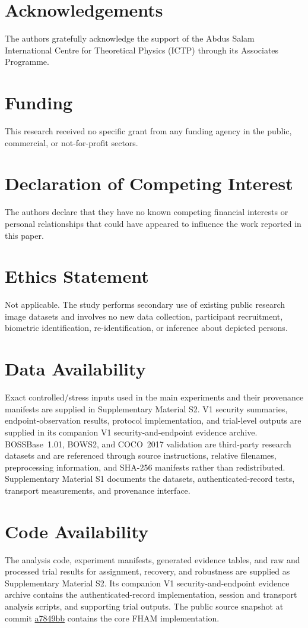 \documentclass[preprint,12pt]{elsarticle}
\theoremstyle{plain}
\providecommand{\DIFaddtex}[1]{{\protect\color{blue} \sf #1}} %
\providecommand{\DIFadd}[1]{\texorpdfstring{\DIFaddtex{#1}}{#1}} %
\begin{document}
\section*{Acknowledgements}
The authors gratefully acknowledge the support of the Abdus Salam International Centre for Theoretical Physics (ICTP) through its Associates Programme.

\section*{Funding}
This research received no specific grant from any funding agency in the public, commercial, or not-for-profit sectors.
\section*{Declaration of Competing Interest}
The authors declare that they have no known competing financial interests or personal relationships that could have appeared to influence the work reported in this paper.
\section*{Ethics Statement}
Not applicable. The study performs secondary use of existing public research image datasets and involves no new data collection, participant recruitment, biometric identification, re-identification, or inference about depicted persons.
\section*{Data Availability}
\DIFadd{Exact controlled/stress inputs used in the main experiments and their provenance manifests are supplied in Supplementary Material S2. V1 security summaries, endpoint-observation results, protocol implementation, and trial-level outputs are supplied in its companion V1 security-and-endpoint evidence archive. BOSSBase~1.01, BOWS2, and COCO~2017 validation are third-party research datasets and are referenced through source instructions, relative filenames, preprocessing information, and SHA-256 manifests rather than redistributed. Supplementary Material S1 documents the datasets, authenticated-record tests, transport measurements, and provenance interface.}

\section*{Code Availability}
\DIFadd{The analysis code, experiment manifests, generated evidence tables, and raw and processed trial results for assignment, recovery, and robustness are supplied as Supplementary Material S2. Its companion V1 security-and-endpoint evidence archive contains the authenticated-record implementation, session and transport analysis scripts, and supporting trial outputs. The public source snapshot at commit \href{https://github.com/EkodeckStephane/FHAM/tree/a7849bb}{a7849bb} contains the core FHAM implementation.}
\end{document}
